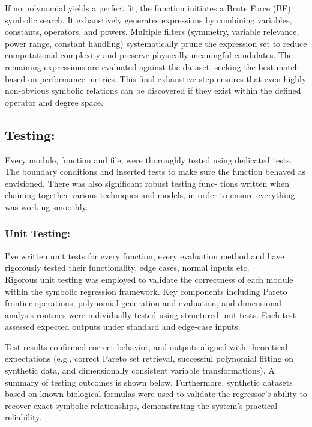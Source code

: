 \documentclass{article}
\begin{document}
If no polynomial yields a perfect fit, the function initiates a Brute Force (BF) symbolic search. It exhaustively generates expressions by combining variables, constants, operators, and powers. Multiple filters (symmetry, variable relevance, power range, constant handling) systematically prune the expression set to reduce computational complexity and preserve physically meaningful candidates. The remaining expressions are evaluated against the dataset, seeking the best match based on performance metrics. This final exhaustive step ensures that even highly non-obvious symbolic relations can be discovered if they exist within the defined operator and degree space.

\subsection{Testing:}
Every module, function and file, were thoroughly tested using dedicated tests. The boundary conditions and
inserted tests to make sure the function behaved as envisioned. There was also significant robust testing func-
tions written when chaining together various techniques and models, in order to ensure everything was working
smoothly.\\

\subsubsection{Unit Testing: }

I've written unit tests for every function, every evaluation method and have rigorously tested their functionality, edge cases, normal inputs etc. \\

Rigorous unit testing was employed to validate the correctness of each module within the symbolic regression framework. Key components including Pareto frontier operations, polynomial generation and evaluation, and dimensional analysis routines were individually tested using structured unit tests. Each test assessed expected outputs under standard and edge-case inputs.

Test results confirmed correct behavior, and outputs aligned with theoretical expectations (e.g., correct Pareto set retrieval, successful polynomial fitting on synthetic data, and dimensionally consistent variable transformations). A summary of testing outcomes is shown below. Furthermore, synthetic datasets based on known biological formulas were used to validate the regressor’s ability to recover exact symbolic relationships, demonstrating the system’s practical reliability.\\
\end{document}
